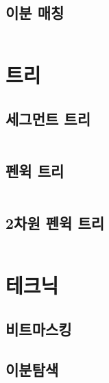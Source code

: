 \documentclass{article}
\begin{document}
\begin{multicols}{2}
\subsection{이분 매칭}
\inputminted[linenos, breaklines]{python}{codes/bimatch.py}

\section{트리}
\subsection{세그먼트 트리}
\inputminted[linenos, breaklines]{cpp}{codes/segtree.cpp}
\subsection{펜윅 트리}
\inputminted[linenos, breaklines]{python}{codes/fenwick.py}
\subsection{2차원 펜윅 트리}
\inputminted[linenos, breaklines]{python}{codes/fenwick2d.py}

\section{테크닉}
\subsection{비트마스킹}
\subsection{이분탐색}
\inputminted[linenos, breaklines]{python}{codes/bisect.py}


\end{multicols}
%
%
	
\end{document}
